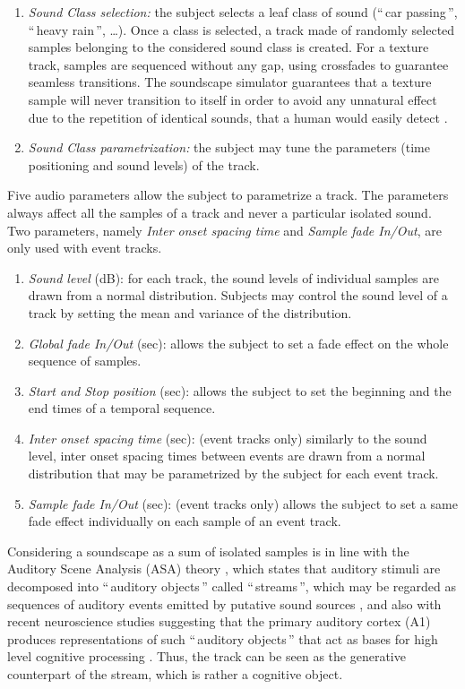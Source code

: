 \documentclass[twoside,twocolumn]{article}
\begin{document}
\begin{enumerate}
\item \textit{Sound Class selection:}  the subject selects a leaf class of sound (``\,car passing\,'', ``\,heavy rain\,'', \ldots{}). Once a class is selected, a track made of randomly selected samples belonging to the considered sound class is created. For a texture track, samples are sequenced without any gap, using crossfades to guarantee seamless transitions. The soundscape simulator guarantees that a texture sample will never transition to itself in order to avoid any unnatural effect due to the repetition of identical sounds, that a human would easily detect \cite{agus_rapid_2010}.
\item \textit{Sound Class parametrization:} the subject may tune the parameters (time positioning and sound levels) of the track.
\end{enumerate}

Five audio parameters allow the subject to parametrize a track. The parameters always affect all the samples of a track and never a particular isolated sound. Two parameters, namely \textit{Inter onset spacing time} and \textit{Sample fade In/Out}, are only used with event tracks. 

\begin{enumerate}
\item \textit{Sound level} (dB): for each track, the sound levels of individual samples are drawn from a normal distribution. Subjects may control the sound level of a track by setting the mean and variance of the distribution. 
\item \textit{Global fade In/Out} (sec):  allows the subject to set a fade effect on the whole sequence of samples. 
\item \textit{Start and Stop position} (sec): allows the subject to set the beginning and the end times of a temporal sequence.
\item \textit{Inter onset spacing time} (sec): (event tracks only) similarly to the sound level, inter onset spacing times between events are drawn from a normal distribution that may be parametrized by the subject for each event track.
\item \textit{Sample fade In/Out} (sec): (event tracks only) allows the subject to set a same fade effect individually on each sample of an event track.
\end{enumerate}

Considering a soundscape as a sum of isolated samples is in line with the Auditory Scene Analysis (ASA) theory \cite{bregman1994auditory}, which states that auditory stimuli are decomposed into ``\,auditory objects\,'' called ``\,streams\,'', which may be regarded as sequences of auditory events emitted by putative sound sources \cite{ciocca2007auditory,winkler2009modeling}, and also with recent neuroscience studies suggesting that the primary auditory cortex (A1) produces representations of such ``\,auditory objects\,'' that act as bases for high level cognitive processing \cite{nelken2008neurons}. Thus, the track can be seen as the generative counterpart of the stream, which is rather a cognitive object.
\end{document}
